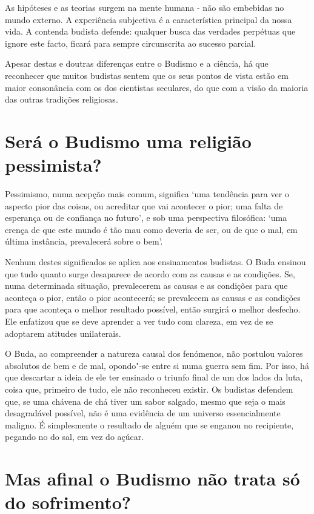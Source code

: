 As hipóteses e as teorias surgem na mente humana - não são embebidas no
mundo externo. A experiência subjectiva é a característica principal da
nossa vida. A contenda budista defende: qualquer busca das verdades
perpétuas que ignore este facto, ficará para sempre circunscrita ao sucesso
parcial.

Apesar destas e doutras diferenças entre o Budismo e a ciência, há que
reconhecer que muitos budistas sentem que os seus pontos de vista estão
em maior consonância com os dos cientistas seculares, do que com a visão
da maioria das outras tradições religiosas.

\section{Será o Budismo uma religião pessimista?}

Pessimismo, numa acepção mais comum, significa `uma tendência para ver
o aspecto pior das coisas, ou acreditar que vai acontecer o pior; uma
falta de esperança ou de confiança no futuro', e sob uma perspectiva
filosófica: `uma crença de que este mundo é tão mau como deveria de
ser, ou de que o mal, em última instância, prevalecerá sobre o bem'.

Nenhum destes significados se aplica aos ensinamentos budistas. O Buda
ensinou que tudo quanto surge desaparece de acordo com as causas e as
condições. Se, numa determinada situação, prevalecerem as causas e as
condições para que aconteça o pior, então o pior acontecerá; se
prevalecem as causas e as condições para que aconteça o melhor resultado
possível, então surgirá o melhor desfecho. Ele enfatizou que se deve
aprender a ver tudo com clareza, em vez de se adoptarem atitudes
unilaterais.

O Buda, ao compreender a natureza causal dos fenómenos, não postulou
valores absolutos de bem e de mal, opondo"-se entre si numa guerra sem
fim. Por isso, há que descartar a ideia de ele ter ensinado o triunfo
final de um dos lados da luta, coisa que, primeiro de tudo, ele não
reconheceu existir. Os budistas defendem que, se uma chávena de chá
tiver um sabor salgado, mesmo que seja o mais desagradável possível, não
é uma evidência de um universo essencialmente maligno. É simplesmente o
resultado de alguém que se enganou no recipiente, pegando no do sal, em
vez do açúcar.

\section{Mas afinal o Budismo não trata só do sofrimento?}

